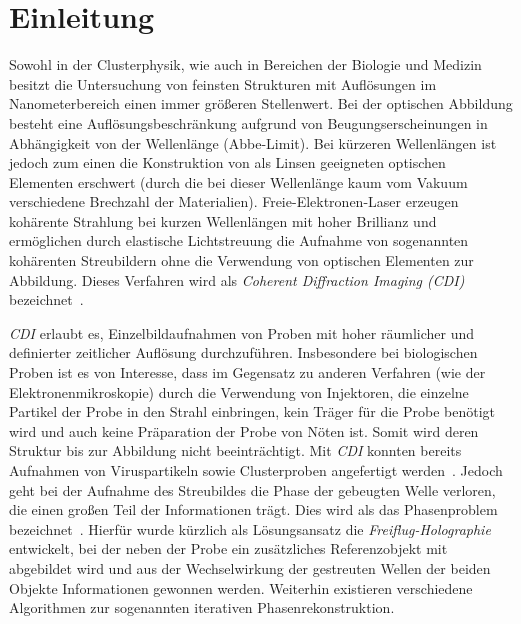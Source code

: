 \chapter{Einleitung}
Sowohl in der Clusterphysik, wie auch in Bereichen der Biologie und Medizin besitzt die Untersuchung von feinsten Strukturen mit Auflösungen im Nanometerbereich einen immer größeren Stellenwert. Bei der optischen Abbildung besteht eine Auflösungsbeschränkung aufgrund von Beugungserscheinungen in Abhängigkeit von der Wellenlänge (Abbe-Limit). Bei kürzeren Wellenlängen ist jedoch zum einen die Konstruktion von als Linsen geeigneten optischen Elementen erschwert (durch die bei dieser Wellenlänge kaum vom Vakuum verschiedene Brechzahl der Materialien). Freie-Elektronen-Laser erzeugen kohärente Strahlung bei kurzen Wellenlängen mit hoher Brillianz und ermöglichen durch elastische Lichtstreuung die Aufnahme von sogenannten kohärenten Streubildern ohne die Verwendung von optischen Elementen zur Abbildung. Dieses Verfahren wird als \textit{Coherent Diffraction Imaging (CDI)} bezeichnet~\cite{schultz2013chapter7}.

\textit{CDI} erlaubt es, Einzelbildaufnahmen von Proben mit hoher räumlicher und definierter zeitlicher Auflösung durchzuführen. Insbesondere bei biologischen Proben ist es von Interesse, dass im Gegensatz zu anderen Verfahren (wie der Elektronenmikroskopie) durch die Verwendung von Injektoren, die einzelne Partikel der Probe in den Strahl einbringen, kein Träger für die Probe benötigt wird und auch keine Präparation der Probe von Nöten ist. Somit wird deren Struktur bis zur Abbildung nicht beeinträchtigt. Mit \textit{CDI} konnten bereits Aufnahmen von Viruspartikeln sowie Clusterproben angefertigt werden~\cite{seibert2011}. Jedoch geht bei der Aufnahme des Streubildes die Phase der gebeugten Welle verloren, die einen großen Teil der Informationen trägt. Dies wird als das Phasenproblem bezeichnet~\cite{shechtman2015}. Hierfür wurde kürzlich als Lösungsansatz die \textit{Freiflug-Holographie} entwickelt, bei der neben der Probe ein zusätzliches Referenzobjekt mit abgebildet wird und aus der Wechselwirkung der gestreuten Wellen der beiden Objekte Informationen gewonnen werden. Weiterhin existieren verschiedene Algorithmen zur sogenannten  iterativen Phasenrekonstruktion.

